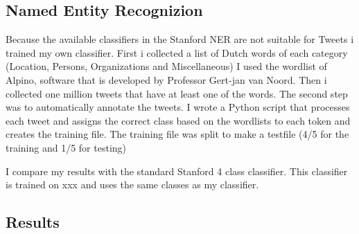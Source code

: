 \documentclass[
10pt, %
a4paper, %
oneside, %
headinclude,footinclude, %
BCOR5mm, %
]{scrartcl}
\begin{document}
\subsection{Named Entity Recognizion}
Because the available classifiers in the Stanford NER are not suitable for Tweets i trained my own classifier. First i collected a list of Dutch words of each category (Location, Persons, Organizations and Miscellaneous) I used the wordlist of Alpino,  software that is developed by Professor Gert-jan van Noord. Then i collected one million tweets that have at least one of the words. The second step was to automatically annotate the tweets. I wrote a Python script that processes each tweet and assigns the correct class based on the wordlists to each token and creates the training file. The training file was split to make a testfile (4/5 for the training and 1/5 for testing)

I compare my results with the standard Stanford 4 class classifier. This classifier is trained on xxx and uses the same classes as my classifier.




\subsection{Results}
\lipsum[7] %
\end{document}
